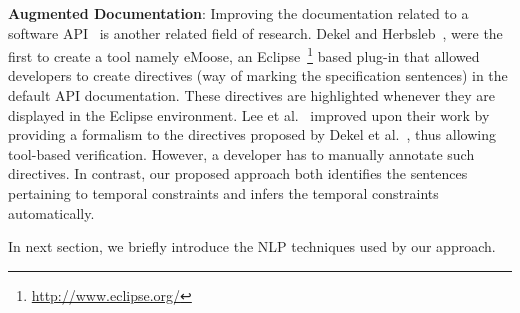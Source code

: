 \textbf{Augmented Documentation}:
Improving the documentation related to a software API~\cite{Dekel2009,tan2011acomment} is another related field of research.
Dekel and Herbsleb~\cite{Dekel2009}, were the first to create a tool namely eMoose,
an Eclipse~\footnote{\url{http://www.eclipse.org/}} based plug-in that allowed developers to create directives
(way of marking the specification sentences) in the default API documentation.
These directives are highlighted whenever they are displayed in the Eclipse environment.
Lee et al.~\cite{lee2012towards} improved upon their work by providing a formalism to the directives proposed by Dekel et al.~\cite{Dekel2009},
thus allowing tool-based verification.
However, a developer has to manually annotate such directives.
In contrast, our proposed approach both identifies the sentences pertaining to temporal constraints and infers the temporal constraints automatically. 

In next section, we briefly introduce the NLP techniques used by our approach.